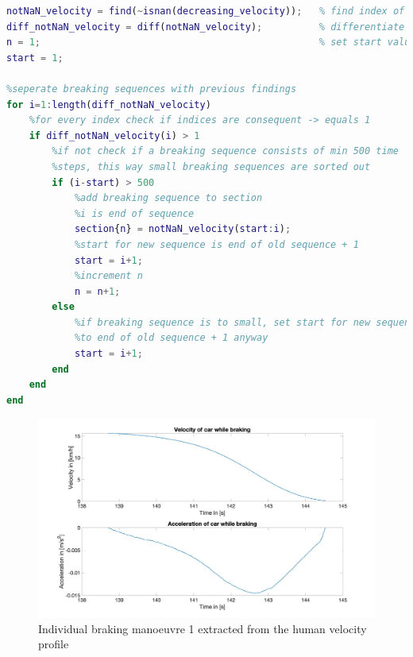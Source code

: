\begin{lstlisting}[language=Matlab,basicstyle=\scriptsize	,caption= Separating breaking sequences,label= lst:D3Seperat]
%find individual breaking sequences
notNaN_velocity = find(~isnan(decreasing_velocity));   % find index of every velocity that is not NaN -> one breaking sequence has consequent time steps -> one breaking sequence has consequent indices
diff_notNaN_velocity = diff(notNaN_velocity);          % differentiate indices -> if indices are not consequent (unequal 1), a new breaking sequence has begun
n = 1;                                                 % set start values
start = 1;

%seperate breaking sequences with previous findings
for i=1:length(diff_notNaN_velocity)
    %for every index check if indices are consequent -> equals 1
    if diff_notNaN_velocity(i) > 1
        %if not check if a breaking sequence consists of min 500 time
        %steps, this way small breaking sequences are sorted out
        if (i-start) > 500
            %add breaking sequence to section
            %i is end of sequence
            section{n} = notNaN_velocity(start:i);
            %start for new sequence is end of old sequence + 1
            start = i+1;
            %increment n
            n = n+1;
        else
            %if breaking sequence is to small, set start for new sequence
            %to end of old sequence + 1 anyway
            start = i+1;
        end
    end
end
\end{lstlisting}


\begin{figure}[H]
\centering
\includegraphics[width=1\textwidth]{images/D3_example1.jpg}
\caption{Individual braking manoeuvre 1 extracted from the human velocity profile}
\label{fig:D3_IndividualBraking1}
\end{figure}

